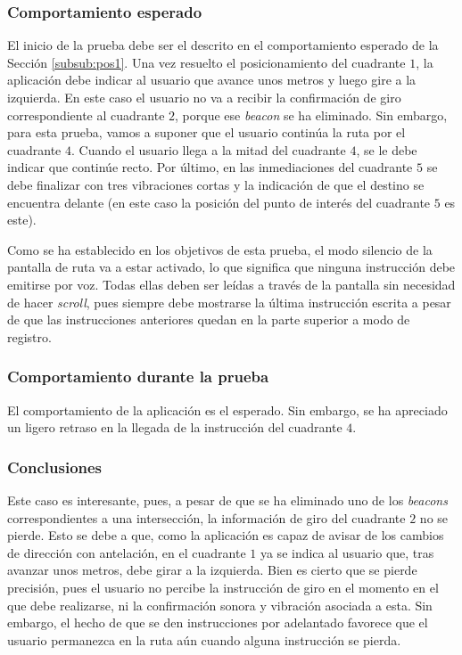 \subsubsection*{Comportamiento esperado}

El inicio de la prueba debe ser el descrito en el comportamiento esperado de la Sección \ref{subsub:pos1}. Una vez resuelto el posicionamiento del cuadrante $1$, la aplicación debe indicar al usuario que avance unos metros y luego gire a la izquierda. En este caso el usuario no va a recibir la confirmación de giro correspondiente al cuadrante $2$, porque ese \textit{beacon} se ha eliminado. Sin embargo, para esta prueba, vamos a suponer que el usuario continúa la ruta por el cuadrante $4$. Cuando el usuario llega a la mitad del cuadrante $4$, se le debe indicar que continúe recto. Por último, en las inmediaciones del cuadrante $5$ se debe finalizar con tres vibraciones cortas y la indicación de que el destino se encuentra delante (en este caso la posición del punto de interés del cuadrante $5$ es este).

Como se ha establecido en los objetivos de esta prueba, el modo silencio de la pantalla de ruta va a estar activado, lo que significa que ninguna instrucción debe emitirse por voz. Todas ellas deben ser leídas a través de la pantalla sin necesidad de hacer \textit{scroll}, pues siempre debe mostrarse la última instrucción escrita a pesar de que las instrucciones anteriores quedan en la parte superior a modo de registro. 


\subsubsection*{Comportamiento durante la prueba}

El comportamiento de la aplicación es el esperado. Sin embargo, se ha apreciado un ligero retraso en la llegada de la instrucción del cuadrante $4$. 

 
\subsubsection*{Conclusiones}

Este caso es interesante, pues, a pesar de que se ha eliminado uno de los \textit{beacons} correspondientes a una intersección, la información de giro del cuadrante $2$ no se pierde. Esto se debe a que, como la aplicación es capaz de avisar de los cambios de dirección con antelación, en el cuadrante $1$ ya se indica al usuario que, tras avanzar unos metros, debe girar a la izquierda. Bien es cierto que se pierde precisión, pues el usuario no percibe la instrucción de giro en el momento en el que debe realizarse, ni la confirmación sonora y vibración asociada a esta. Sin embargo, el hecho de que se den instrucciones por adelantado favorece que el usuario permanezca en la ruta aún cuando alguna instrucción se pierda. 

